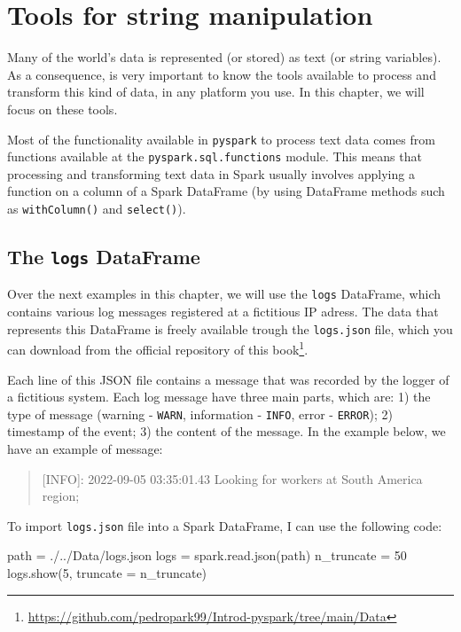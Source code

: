 \documentclass[
  11pt,
  letterpaper,
  DIV=11,
  numbers=noendperiod]{scrreprt}
\newenvironment{Shaded}{\begin{snugshade}}{\end{snugshade}}
\newcommand{\DecValTok}[1]{\textcolor[rgb]{0.68,0.00,0.00}{#1}}
\newcommand{\NormalTok}[1]{\textcolor[rgb]{0.00,0.23,0.31}{#1}}
\newcommand{\OperatorTok}[1]{\textcolor[rgb]{0.37,0.37,0.37}{#1}}
\newcommand{\StringTok}[1]{\textcolor[rgb]{0.13,0.47,0.30}{#1}}
\begin{document}

\chapter{Tools for string manipulation}\label{sec-string-tools}

Many of the world's data is represented (or stored) as text (or string
variables). As a consequence, is very important to know the tools
available to process and transform this kind of data, in any platform
you use. In this chapter, we will focus on these tools.

Most of the functionality available in \texttt{pyspark} to process text
data comes from functions available at the
\texttt{pyspark.sql.functions} module. This means that processing and
transforming text data in Spark usually involves applying a function on
a column of a Spark DataFrame (by using DataFrame methods such as
\texttt{withColumn()} and \texttt{select()}).

\section{\texorpdfstring{The \texttt{logs}
DataFrame}{The logs DataFrame}}\label{the-logs-dataframe}

Over the next examples in this chapter, we will use the \texttt{logs}
DataFrame, which contains various log messages registered at a
fictitious IP adress. The data that represents this DataFrame is freely
available trough the \texttt{logs.json} file, which you can download
from the official repository of this book\footnote{\url{https://github.com/pedropark99/Introd-pyspark/tree/main/Data}}.

Each line of this JSON file contains a message that was recorded by the
logger of a fictitious system. Each log message have three main parts,
which are: 1) the type of message (warning - \texttt{WARN}, information
- \texttt{INFO}, error - \texttt{ERROR}); 2) timestamp of the event; 3)
the content of the message. In the example below, we have an example of
message:

\begin{quote}
{[}INFO{]}: 2022-09-05 03:35:01.43 Looking for workers at South America
region;
\end{quote}

To import \texttt{logs.json} file into a Spark DataFrame, I can use the
following code:

\begin{Shaded}
\begin{Highlighting}[]
\NormalTok{path }\OperatorTok{=} \StringTok{\textquotesingle{}./../Data/logs.json\textquotesingle{}}
\NormalTok{logs }\OperatorTok{=}\NormalTok{ spark.read.json(path)}
\NormalTok{n\_truncate }\OperatorTok{=} \DecValTok{50}
\NormalTok{logs.show(}\DecValTok{5}\NormalTok{, truncate }\OperatorTok{=}\NormalTok{ n\_truncate)}
\end{Highlighting}
\end{Shaded}
\end{document}
